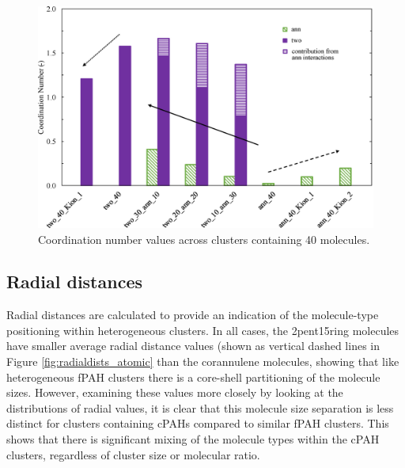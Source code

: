 \begin{figure}[!tbh]
\centering
\includegraphics[width=0.8\linewidth]{Figures/CN_bar_chart.eps}
\caption{Coordination number values across clusters containing 40 molecules.}
\label{fig:coordination_numbers}
\end{figure}
%



\subsection{Radial distances}

Radial distances are calculated to provide an indication of the molecule-type positioning within heterogeneous clusters. In all cases, the 2pent15ring molecules have smaller average radial distance values (shown as vertical dashed lines in Figure \ref{fig:radialdists_atomic} than the corannulene molecules, showing that like heterogeneous fPAH clusters \cite{bowal2018partitioning} there is a core-shell partitioning of the molecule sizes. 
However, examining these values more closely by looking at the distributions of radial values, it is clear that this molecule size separation is less distinct for clusters containing cPAHs compared to similar fPAH clusters. This shows that there is significant mixing of the molecule types within the cPAH clusters, regardless of cluster size or molecular ratio.

